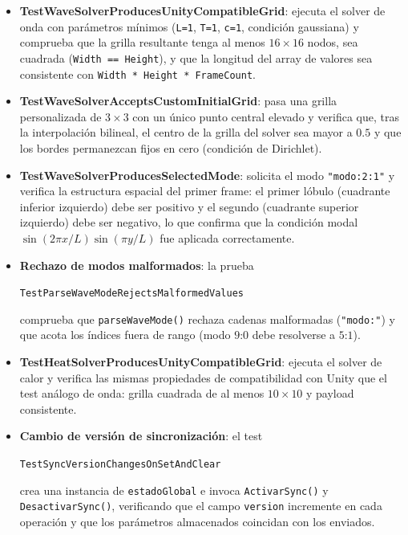 \documentclass[12pt, a4paper]{article}
\begin{document}
\begin{itemize}

    \item \textbf{TestWaveSolverProducesUnityCompatibleGrid}: ejecuta el solver de
    onda con parámetros mínimos (\texttt{L=1}, \texttt{T=1}, \texttt{c=1},
    condición gaussiana) y comprueba que la grilla resultante tenga al menos
    $16\times16$ nodos, sea cuadrada (\texttt{Width == Height}), y que la longitud
    del array de valores sea consistente con \texttt{Width * Height * FrameCount}.

    \item \textbf{TestWaveSolverAcceptsCustomInitialGrid}: pasa una grilla
    personalizada de $3\times3$ con un único punto central elevado y verifica que,
    tras la interpolación bilineal, el centro de la grilla del solver sea mayor a
    $0.5$ y que los bordes permanezcan fijos en cero (condición de Dirichlet).

    \item \textbf{TestWaveSolverProducesSelectedMode}: solicita el modo
    \texttt{"modo:2:1"} y verifica la estructura espacial del primer frame: el
    primer lóbulo (cuadrante inferior izquierdo) debe ser positivo y el segundo
    (cuadrante superior izquierdo) debe ser negativo, lo que confirma que la
    condición modal $\sin(2\pi x/L)\sin(\pi y/L)$ fue aplicada correctamente.

    \item \textbf{Rechazo de modos malformados}: la prueba
    \par\texttt{TestParseWaveModeRejectsMalformedValues}\par
    comprueba que
    \texttt{parseWaveMode()} rechaza cadenas malformadas (\texttt{"modo:"}) y
    que acota los índices fuera de rango (modo $9$:$0$ debe resolverse a
    $5$:$1$).

    \item \textbf{TestHeatSolverProducesUnityCompatibleGrid}: ejecuta el solver de
    calor y verifica las mismas propiedades de compatibilidad con Unity que el test
    análogo de onda: grilla cuadrada de al menos $10\times10$ y payload
    consistente.

    \item \textbf{Cambio de versión de sincronización}: el test
    \par\texttt{TestSyncVersionChangesOnSetAndClear}\par
    crea una instancia de
    \texttt{estadoGlobal} e invoca \texttt{ActivarSync()} y \texttt{DesactivarSync()},
    verificando que el campo \texttt{version} incremente en cada operación y que
    los parámetros almacenados coincidan con los enviados.
\end{itemize}
\end{document}
